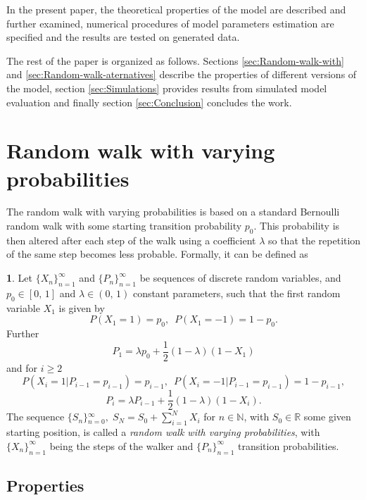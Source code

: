 \documentclass{amsart}
\theoremstyle{definition}
\newtheorem{defn}[thm]{\protect\definitionname}
\theoremstyle{plain}
\theoremstyle{plain}
\theoremstyle{plain}
\numberwithin{equation}{section}
\providecommand{\definitionname}{Definition}
\begin{document}
In the present paper, the theoretical properties of the model are
described and further examined, numerical procedures of model
parameters estimation are specified and the results are tested on
generated data.

The rest of the paper is organized as follows. Sections
\ref{sec:Random-walk-with} and \ref{sec:Random-walk-aternatives}
describe the properties of different versions of the model,
section \ref{sec:Simulations} provides results from simulated
model {\color{red}evaluation} and finally section \ref{sec:Conclusion} concludes
the work.

\section{Random walk with varying probabilities\label{sec:Random-walk-with}}

The random walk with varying probabilities is based on a standard
Bernoulli random walk \cite{feller1957introduction} with some starting
transition probability $p_{0}$. This probability is then altered
after each step of the walk using a coefficient $\lambda$ so that
the repetition of the same step becomes less probable. Formally, it
can be defined as
\begin{defn}
\label{success_punished}Let ${\{X_{n}\}}_{n=1}^{\infty}$ and ${\{P_{n}\}}_{n=1}^{\infty}$
be sequences of discrete random variables, and $p_{0}\in[0,\,1]$
and $\lambda\in(0,\,1)$ constant parameters, such that the first
random variable $X_{1}$ is given by
\[
P(X_{1}=1)=p_{0},\,\,\,
P(X_{1}=-1)=1-p_{0}.
\]
Further
\begin{equation}
P_{1}=\lambda p_{0}+\frac{1}{2}(1-\lambda)(1-X_{1})\label{eq:P!1_def}
\end{equation}
and for $i\geq2$
\[
P(X_{i}=1|P_{i-1}=p_{i-1})=p_{i-1},\,\,\,
P(X_{i}=-1|P_{i-1}=p_{i-1})=1-p_{i-1},
\]
\begin{equation}
P_{i}=\lambda P_{i-1}+\frac{1}{2}(1-\lambda)(1-X_{i}).\label{eq:Pi_def}
\end{equation}
The sequence ${\{S_{n}\}}{}_{n=0}^{\infty},\;S_{N}=S_{0}+\sum_{i=1}^{N}X_{i}$
for $n\in\mathbb{N}$, with $S_{0}\in\mathbb{R}$ some given starting
position, is called a \emph{random walk with varying probabilities},
with ${\{X_{n}\}}_{n=1}^{\infty}$ being the steps of the walker and
${\{P_{n}\}}_{n=1}^{\infty}$ transition probabilities.
\end{defn}

\subsection{Properties}
\end{document}

